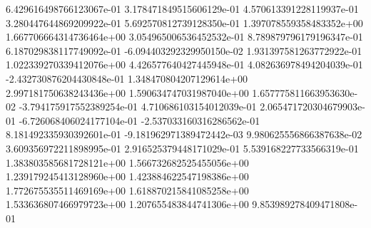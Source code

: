 	6.429616498766123067e-01	3.178471849515606129e-01	4.570613391228119937e-01	3.280447644869209922e-01	5.692570812739128350e-01	1.397078559358483352e+00	1.667706664314736464e+00	3.054965006536452532e-01	8.789879796179196347e-01	6.187029838117749092e-01	-6.094403292329950150e-02	1.931397581263772922e-01	1.022339270339412076e+00	4.426577640427445948e-01	4.082636978494204039e-01	-2.432730876204430848e-01	1.348470804207129614e+00	2.997181750638243436e+00	1.590634747031987040e+00	1.657775811663953630e-02	-3.794175917552389254e-01	4.710686103154012039e-01	2.065471720304679903e-01	-6.726068406024177104e-01	-2.537033160316286562e-01	8.181492335930392601e-01	-9.181962971389472442e-03	9.980625556866387638e-02	3.609356972211898995e-01	2.916525379448171029e-01	5.539168227733566319e-01	1.383803585681728121e+00	1.566732682525455056e+00	1.239179245413128960e+00	1.423884622547198386e+00	1.772675535511469169e+00	1.618870215841085258e+00	1.533636807466979723e+00	1.207655483844741306e+00	9.853989278409471808e-01
